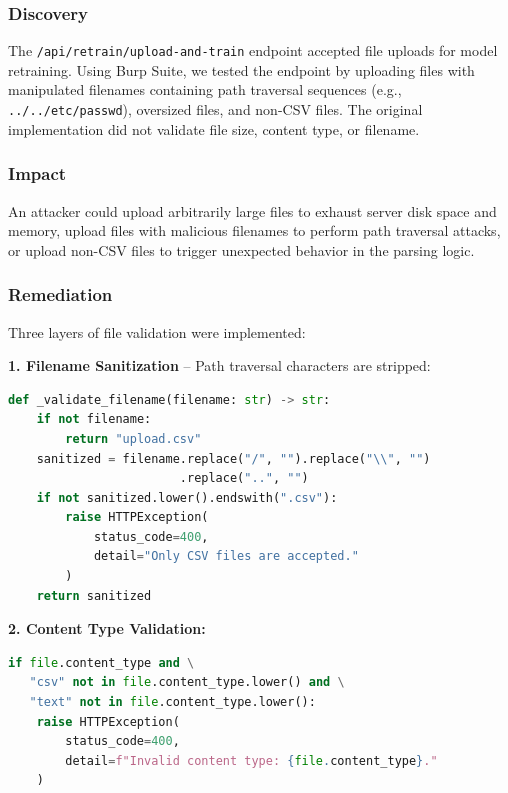 \documentclass[12pt,a4paper]{article}
\begin{document}
\subsubsection{Discovery}

The \texttt{/api/retrain/upload-and-train} endpoint accepted file uploads for model retraining. Using Burp Suite, we tested the endpoint by uploading files with manipulated filenames containing path traversal sequences (e.g., \texttt{../../etc/passwd}), oversized files, and non-CSV files. The original implementation did not validate file size, content type, or filename.

\subsubsection{Impact}

An attacker could upload arbitrarily large files to exhaust server disk space and memory, upload files with malicious filenames to perform path traversal attacks, or upload non-CSV files to trigger unexpected behavior in the parsing logic.

\subsubsection{Remediation}

Three layers of file validation were implemented:

\textbf{1. Filename Sanitization} -- Path traversal characters are stripped:

\begin{lstlisting}[language=Python, caption={Filename sanitization}]
def _validate_filename(filename: str) -> str:
    if not filename:
        return "upload.csv"
    sanitized = filename.replace("/", "").replace("\\", "")
                        .replace("..", "")
    if not sanitized.lower().endswith(".csv"):
        raise HTTPException(
            status_code=400,
            detail="Only CSV files are accepted."
        )
    return sanitized
\end{lstlisting}

\textbf{2. Content Type Validation:}

\begin{lstlisting}[language=Python, caption={MIME type validation}]
if file.content_type and \
   "csv" not in file.content_type.lower() and \
   "text" not in file.content_type.lower():
    raise HTTPException(
        status_code=400,
        detail=f"Invalid content type: {file.content_type}."
    )
\end{lstlisting}
\end{document}
